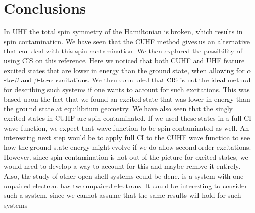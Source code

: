 \section{Conclusions}
In UHF the total spin symmetry of the Hamiltonian is broken, which results in spin contamination. 
We have seen that the CUHF method gives us an alternative that can deal with this spin contamination. We then explored the possibility of using CIS on this reference. Here we
noticed that both CUHF and UHF feature excited states that are lower in energy than the ground state, when allowing for $\alpha$-to-$\beta$ and $\beta$-to-$\alpha$ excitations.
We then concluded that CIS is not the ideal method for describing such systems if one wants to account for such excitations. This was based upon the fact that we found an excited
state that was lower in energy than the ground state at equilibrium geometry. We have also seen that the singly excited states in CUHF are spin contaminated. If we used these
states in a full CI wave function, we expect that wave function to be spin contaminated as well.
An interesting next step would be to apply full CI to the CUHF wave function to see how the ground state energy might evolve if we do allow second order excitations. However, since
spin contamination is not out of the picture for excited states, we would need to develop a way to account for this and maybe remove it entirely. Also, the
study of other open shell systems could be done.  is a system with one unpaired electron.  has two unpaired electrons. It could be interesting to consider such a system,
since we cannot assume that the same results will hold for such systems.